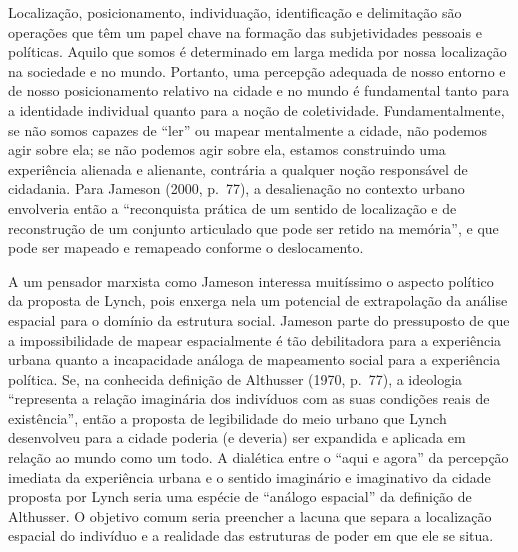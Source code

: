Localização, posicionamento, individuação, identificação e delimitação
são operações que têm um papel chave na formação das subjetividades
pessoais e políticas. Aquilo que somos é determinado em larga medida por
nossa localização na sociedade e no mundo. Portanto, uma percepção
adequada de nosso entorno e de nosso posicionamento relativo na cidade e
no mundo é fundamental tanto para a identidade individual quanto para a
noção de coletividade. Fundamentalmente, se não somos capazes de ``ler''
ou mapear mentalmente a cidade, não podemos agir sobre ela; se não
podemos agir sobre ela, estamos construindo uma experiência alienada e
alienante, contrária a qualquer noção responsável de cidadania. Para
Jameson (2000, p.~77), a desalienação no contexto urbano envolveria
então a ``reconquista prática de um sentido de localização e de
reconstrução de um conjunto articulado que pode ser retido na memória'',
e que pode ser mapeado e remapeado conforme o deslocamento.

A um pensador marxista como Jameson interessa muitíssimo o aspecto
político da proposta de Lynch, pois enxerga nela um potencial de
extrapolação da análise espacial para o domínio da estrutura social.
Jameson parte do pressuposto de que a impossibilidade de mapear
espacialmente é tão debilitadora para a experiência urbana quanto a
incapacidade análoga de mapeamento social para a experiência política.
Se, na conhecida definição de Althusser (1970, p.~77), a ideologia
``representa a relação imaginária dos indivíduos com as suas condições
reais de existência'', então a proposta de legibilidade do meio urbano
que Lynch desenvolveu para a cidade poderia (e deveria) ser expandida e
aplicada em relação ao mundo como um todo. A dialética entre o ``aqui e
agora'' da percepção imediata da experiência urbana e o sentido
imaginário e imaginativo da cidade proposta por Lynch seria uma espécie
de ``análogo espacial'' da definição de Althusser. O objetivo comum
seria preencher a lacuna que separa a localização espacial do indivíduo
e a realidade das estruturas de poder em que ele se situa.


